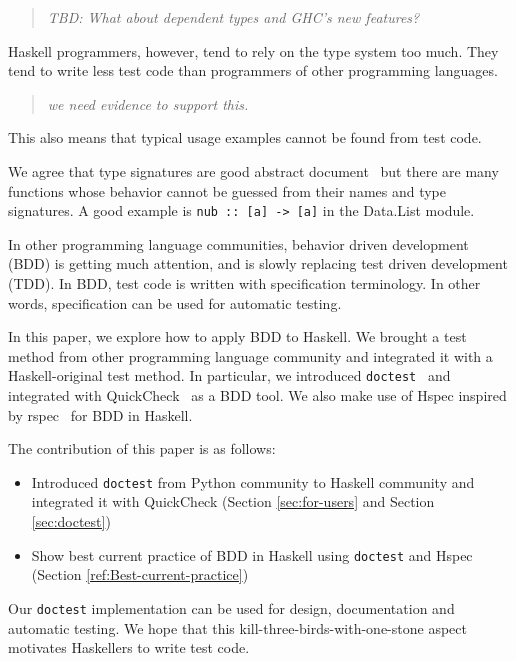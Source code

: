 \documentclass[preprint]{sigplanconf}
\newcommand{\hspec}{Hspec}
\begin{document}
\begin{quote}
    \emph{TBD: What about dependent types and GHC's new features?}
\end{quote}

Haskell programmers, however, tend to rely on the type system too much.  They
tend to write less test code than programmers of other programming languages.

\begin{quote}
    \emph{we need evidence to support this.}
\end{quote}

This also means that typical usage examples cannot be found from test code.

We agree that type signatures are good abstract document~\cite{free}
but there are many
functions whose behavior cannot be guessed from their names and type
signatures. A good example is \verb|nub :: [a] -> [a]| in 
the Data.List module.

In other programming language communities,
behavior driven development (BDD) is getting much attention, and is
slowly replacing test driven development (TDD).
In BDD, test code is written with specification terminology.
In other words, specification can be used for automatic testing.

In this paper, we explore how to apply BDD to Haskell.
We brought a test method from other programming language community and
integrated it with a Haskell-original test method.
In particular, we introduced {\tt doctest}~\cite{doctest} and
integrated with QuickCheck~\cite{quickcheck} as a BDD tool.
We also make use of \hspec{} inspired by rspec~\cite{rspec} for
BDD in Haskell.

The contribution of this paper is as follows:

\begin{itemize}
\item Introduced {\tt doctest} from Python community to Haskell community
and integrated it with QuickCheck
(Section \ref{sec:for-users} and Section \ref{sec:doctest})
\item Show best current practice of BDD in Haskell using {\tt doctest} and \hspec{} (Section \ref{ref:Best-current-practice})
\end{itemize}

\noindent Our {\tt doctest} implementation
can be used for design, documentation and automatic testing.
We hope that this kill-three-birds-with-one-stone aspect
motivates Haskellers to write test code.
\end{document}
